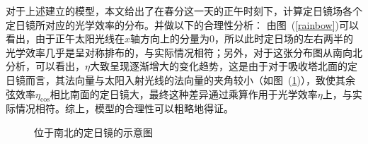 \documentclass[../main.tex]{subfiles}
\begin{document}
对于上述建立的模型，本文给出了在春分这一天的正午时刻下，计算定日镜场各个定日镜所对应的光学效率的分布。并做以下的合理性分析：
由图~(\ref{rainbow})可以看出，由于正午太阳光线在\(x\)轴方向上的分量为\(0\)，所以此时定日场的左右两半的光学效率几乎是呈对称排布的，与实际情况相符；另外，对于这张分布图从南向北分析，可以看出，\(\eta\)大致呈现逐渐增大的变化趋势，这是由于对于吸收塔北面的定日镜而言，其法向量与太阳入射光线的法向量的夹角较小（如图~(\ref{north_south})），致使其余弦效率\(\eta_{\cos}\)相比南面的定日镜大，最终这种差异通过乘算作用于光学效率\(\eta\)上，与实际情况相符。综上，模型的合理性可以粗略地得证。
%
\begin{figure}[H]
\centering

\caption{\kaishu 位于南北的定日镜的示意图}\label{north_south}
\end{figure}
\end{document}

